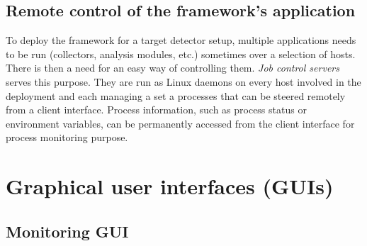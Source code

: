 \documentclass[conference]{IEEEtran}
\begin{document}
\subsection{Remote control of the framework's application}
To deploy the framework for a target detector setup, multiple applications needs to be run (collectors, analysis modules, etc.) sometimes over a selection of hosts. There is then a need for an easy way of controlling them. \textit{Job control servers} serves this purpose. They are run as Linux daemons on every host involved in the deployment and each managing a set a processes that can be steered remotely from a client interface. Process information, such as process status or environment variables, can be permanently accessed from the client interface for process monitoring purpose.

\section{Graphical user interfaces (GUIs)}

\subsection{Monitoring GUI}
\end{document}
